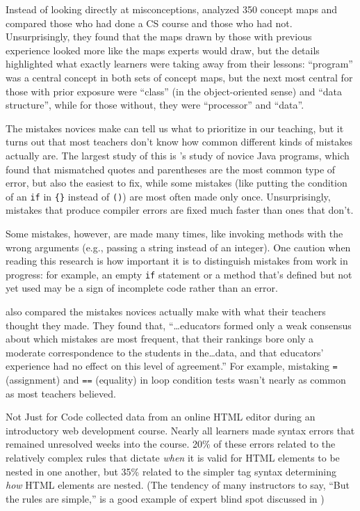 Instead of looking directly at misconceptions, \cite{Muhl2016}
analyzed 350 concept maps and compared those who had done a CS course
and those who had not. Unsurprisingly, they found that the maps drawn by
those with previous experience looked more like the maps experts would
draw, but the details highlighted what exactly learners were taking away
from their lessons: ``program'' was a central concept in both sets of
concept maps, but the next most central for those with prior exposure
were ``class'' (in the object-oriented sense) and ``data structure'', while
for those without, they were ``processor'' and ``data''.


The mistakes novices make can tell us what to prioritize in our
teaching, but it turns out that most teachers don't know how common
different kinds of mistakes actually are. The largest study of this is
\cite{Brow2017}'s study of novice Java programs, which found that
mismatched quotes and parentheses are the most common type of error, but
also the easiest to fix, while some mistakes (like putting the condition
of an \texttt{if} in \texttt{\{\}} instead of \texttt{()}) are most often made only once.
Unsurprisingly, mistakes that produce compiler errors are fixed much
faster than ones that don't.

Some mistakes, however, are made many times, like invoking methods with
the wrong arguments (e.g., passing a string instead of an integer). One
caution when reading this research is how important it is to distinguish
mistakes from work in progress: for example, an empty \texttt{if} statement or
a method that's defined but not yet used may be a sign of incomplete
code rather than an error.

\cite{Brow2017} also compared the mistakes novices actually make with
what their teachers thought they made. They found that,
``{\ldots}educators formed only a weak consensus about which
mistakes are most frequent, that their rankings bore only a moderate
correspondence to the students in the{\ldots}data, and that
educators' experience had no effect on this level of agreement.'' For
example, mistaking \texttt{=} (assignment) and \texttt{==} (equality) in loop
condition tests wasn't nearly as common as most teachers believed.

\begin{aside}{Not Just for Code}
  \cite{Park2015} collected data from an online HTML editor during an
  introductory web development course. Nearly all learners made syntax
  errors that remained unresolved weeks into the course. 20\% of these
  errors related to the relatively complex rules that dictate \emph{when} it
  is valid for HTML elements to be nested in one another, but 35\%
  related to the simpler tag syntax determining \emph{how} HTML elements are
  nested. (The tendency of many instructors to say, ``But the rules are
  simple,'' is a good example of expert blind spot discussed in
  )
\end{aside}


